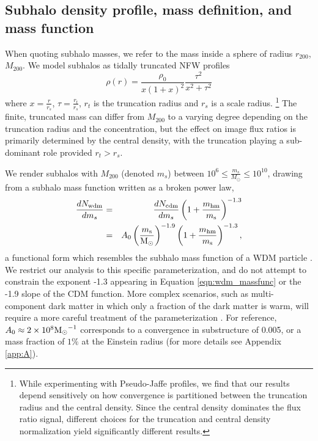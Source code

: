 \subsection{Subhalo density profile, mass definition, and mass function}
\label{ssec:substructure}
When quoting subhalo masses, we refer to the mass inside a sphere of radius $r_{200}$, $M_{200}$. We model subhalos as tidally truncated NFW profiles \citep{Baltz++09}
\begin{equation}
\label{eqn:massprofile}
\rho \left(r\right) = \frac{\rho_0}{x \left(1+x\right)^2} \frac{\tau^2}{x^2 + \tau^2}
\end{equation}
where $x = \frac{r}{r_s}$, $\tau = \frac{r_t}{r_s}$, $r_t$ is the truncation radius and $r_s$ is a scale radius. \footnote{While experimenting with Pseudo-Jaffe profiles, we find that our results depend sensitively on how convergence is partitioned between the truncation radius and the central density. Since the central density dominates the flux ratio signal, different choices for the truncation and central density normalization yield significantly different results.} The finite, truncated mass can differ from $M_{200}$ to a varying degree depending on the truncation radius and the concentration, but the effect on image flux ratios is primarily determined by the central density, with the truncation playing a sub-dominant role provided $r_t > r_s$. 

We render subhalos with $M_{200}$ (denoted $m_s$) between $10^6 \leq \frac{m_s}{M_{\odot}} \leq 10^{10}$, drawing from a subhalo mass function written as a broken power law, 
\begin{eqnarray}
\label{eqn:wdm_massfunc}
\nonumber \frac{dN_{\rm{wdm}}}{dm_s} & = & \frac{dN_{\rm{cdm}}}{dm_s} \left(1+\frac{m_{\rm{hm}}}{m_{\rm{s}}}\right)^{-1.3} \\
& = & A_0 \left(\frac{m_{\rm{s}}}{{\rm{M}_{\odot}}}\right)^{-1.9} \left(1+\frac{m_{\rm{hm}}}{m_{\rm{s}}}\right)^{-1.3},
\end{eqnarray}
a functional form which resembles the subhalo mass function of a WDM particle \citep{Schneider++12,Lovell++14}. We restrict our analysis to this specific parameterization, and do not attempt to constrain the exponent -1.3 appearing in Equation \ref{eqn:wdm_massfunc} or the -1.9 slope of the CDM function. More complex scenarios, such as multi-component dark matter in which only a fraction of the dark matter is warm, will require a more careful treatment of the parameterization \citep[see][]{Vegetti++18}. For reference, $A_0 \approx 2 \times 10^8 {\rm{M}_{\odot}}^{-1}$ corresponds to a convergence in substructure of 0.005, or a mass fraction of $1\%$ at the Einstein radius (for more details see Appendix \ref{app:A}). 

